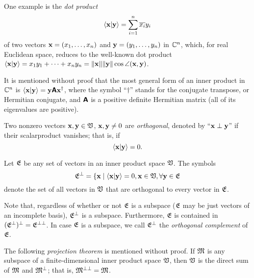 {
\color{blue}
\bexample
One example is the
{\em dot product}
\begin{equation}
\langle  {\bf x} \vert {\bf y} \rangle
=
\sum_{i=1}^n \overline{x_i}y_i
\end{equation}
of two vectors ${\bf x}=
(x_1,\ldots , x_n)$
and
${\bf y}=
(y_1,\ldots , y_n)$ in ${\Bbb C}^n$,
which, for real Euclidean space,  reduces to the well-known dot product
$\langle  {\bf x} \vert {\bf y} \rangle
=
{x_1}y_1 + \cdots + {x_n}y_n  = \| {\bf x}\| \| {\bf y}\| \cos \angle ({\bf x},{\bf y})$.


It is mentioned without proof that the most general form of an inner product in ${\Bbb C}^n$
is
$\langle  {\bf x} \vert {\bf y} \rangle
=  {\bf y} \textsf{\textbf{A}} {\bf x}^\dagger$,
where the symbol ``$\dagger$'' stands for the conjugate transpose, or Hermitian conjugate,
and $ \textsf{\textbf{A}} $ is a positive definite Hermitian matrix (all of its eigenvalues are positive).
\eexample
}

Two nonzero vectors $  {\bf x} , {\bf y} \in {\frak V}$,  $  {\bf x},   {\bf y}\neq 0$
are {\em orthogonal}, denoted by ``${\bf x} \perp {\bf y}$''
if their scalarproduct vanishes; that is, if
\begin{equation}
\langle  {\bf x} \vert {\bf y} \rangle   = 0.
\end{equation}


Let ${\frak E}$ be any set of vectors in an inner product space ${\frak V}$.
The symbols
\begin{equation}
{\frak E}^\perp  =\{ {\bf x}\mid  \langle  {\bf x} \vert {\bf y} \rangle=0,  {\bf x} \in {\frak V},
\forall {\bf y} \in {\frak E}
\end{equation}
 denote the set of all vectors in  ${\frak V}$ that are
orthogonal to every vector in  ${\frak E}$.

Note that, regardless of whether or not ${\frak E}$ is a subspace
(${\frak E}$ may be just vectors of an incomplete basis),
${\frak E}^\perp$ is a subspace.
Furthermore,
${\frak E}$  is contained in $({\frak E}^\perp)^\perp= {\frak E}^{\perp\perp}$.
In case ${\frak E}$ is a subspace, we call ${\frak E}^\perp$
the {\em orthogonal complement}
of ${\frak E}$.

The following {\em projection theorem}
is mentioned without proof.
If ${\frak M}$ is any subspace of a finite-dimensional inner product space ${\frak V}$,
then ${\frak V}$ is the direct sum of ${\frak M}$ and ${\frak M}^\perp$;
that is, ${\frak M}^{\perp \perp}={\frak M}$.

